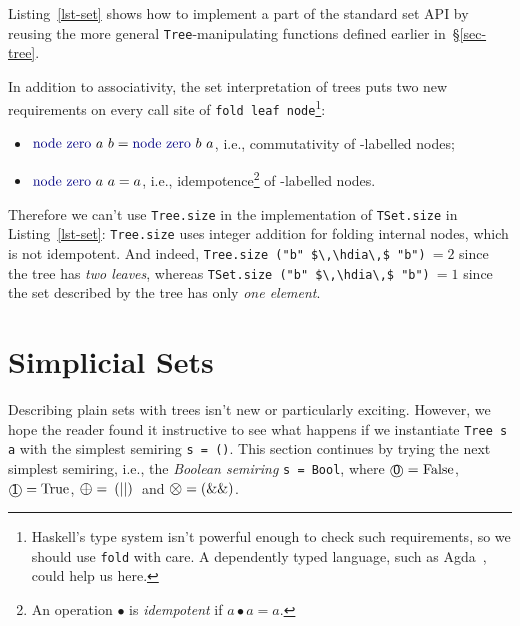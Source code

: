 \documentclass[crc,english]{programming}
\newcommand{\code}[1]{\lstinline[mathescape]|#1|}
\newcommand{\hcode}[1]{{\color{darkblue} \lstinline[keywordstyle={}]|#1|}} %
\newcommand{\hdia}{\,\text{\raisebox{-0.2mm}{\Large\color{darkblue} $\diamond$}}\,}
\newcommand{\add}{\text{\raisebox{-0.1mm}{\large $\oplus$}}}
\newcommand{\mul}{\text{\raisebox{-0.1mm}{\large $\otimes$}}}
\newcommand{\zero}{\raisebox{-0.2mm}{\textcircled{\textsf{0}}}\xspace}
\newcommand{\one}{\raisebox{-0.2mm}{\textcircled{\textsf{\hspace{-0.2mm}1}}}\xspace}
\begin{document}
\noindent
Listing~\ref{lst-set} shows how to implement a part of the standard set API by
reusing the more general \hcode{Tree}-manipulating functions defined earlier
in~\S\ref{sec-tree}.

In addition to associativity, the set interpretation of trees puts two new
requirements on every call site of \hcode{fold leaf node}\footnote{
    Haskell's type system isn't powerful enough to check such requirements, so
    we should use \hcode{fold} with care. A dependently typed language, such as
    Agda~\cite{2007_norell_agda}, could help us here.
}:

\begin{itemize}
    \item $\text{\hcode{node zero}}~a~b = \text{\hcode{node zero}}~b~a$, i.e.,
          commutativity of \zero-labelled nodes;
    \item $\text{\hcode{node zero}}~a~a = a$, i.e.,
    idempotence\footnote{
         An operation $\bullet$ is \emph{idempotent} if $a \bullet a = a$.
    } of \zero-labelled nodes.
\end{itemize}

\noindent
Therefore we can't use \hcode{Tree.}\code{size} in the implementation of
\hcode{TSet.}\code{size} in Listing~\ref{lst-set}: \hcode{Tree.}\code{size} uses
integer addition for folding internal nodes, which is not idempotent. And
indeed, \hcode{Tree.}\code{size ("b" $\,\hdia\,$ "b")}$\ =2$ since the tree has
\emph{two leaves}, whereas \hcode{TSet.}\code{size ("b" $\,\hdia\,$ "b")}$\ = 1$
since the set described by the tree has only \emph{one element}.

\section{Simplicial Sets}\label{sec-simplicial-set}
\vspace{-1mm}

Describing plain sets with trees isn't new or particularly exciting. However, we
hope the reader found it instructive to see what happens if we instantiate
\hcode{Tree s a} with the simplest semiring \hcode{s = ()}. This section
continues by trying the next simplest semiring, i.e., the
\emph{Boolean semiring} \hcode{s = Bool}, where $\zero = \text{\code{False}}$,
$\one = \text{\code{True}}$, $\add = \text{\code{(\|\|)}}$ and
$\mul = \text{\code{(&&)}}$.
\end{document}
